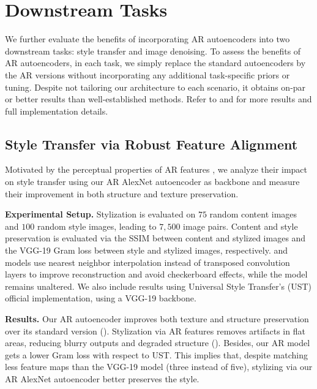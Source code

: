 \section{Downstream Tasks}
\label{sec:tasks}

We further evaluate the benefits of incorporating AR autoencoders into two downstream tasks: style transfer and image denoising. To assess the benefits of AR autoencoders, in each task, we simply replace the standard autoencoders by the AR versions without incorporating any additional task-specific priors or tuning. Despite not tailoring our architecture to each scenario, it obtains on-par or better results than well-established methods. Refer to  and  for more results and full implementation details.

\subsection{Style Transfer via Robust Feature Alignment}


Motivated by the perceptual properties of AR features \cite{engstrom_2019_adversarial}, we analyze their impact on style transfer using our AR AlexNet autoencoder as backbone and measure their improvement in both structure and texture preservation.

\textbf{Experimental Setup.} Stylization is evaluated on $75$ random content images and $100$ random style images, leading to $7,500$ image pairs. Content and style preservation is evaluated via the SSIM between content and stylized images and the VGG-19 Gram loss between style and stylized images, respectively.  and  models use nearest neighbor interpolation instead of transposed convolution layers to improve reconstruction and avoid checkerboard effects, while the  model remains unaltered. We also include results using Universal Style Transfer's (UST) official implementation, using a VGG-19 backbone.

\textbf{Results.} Our AR autoencoder improves both texture and structure preservation over its standard version (). Stylization via AR features removes artifacts in flat areas, reducing blurry outputs and degraded structure (). Besides, our AR model gets a lower Gram loss with respect to UST. This implies that, despite matching less feature maps than the VGG-19 model (three instead of five), stylizing via our AR AlexNet autoencoder better preserves the style.

